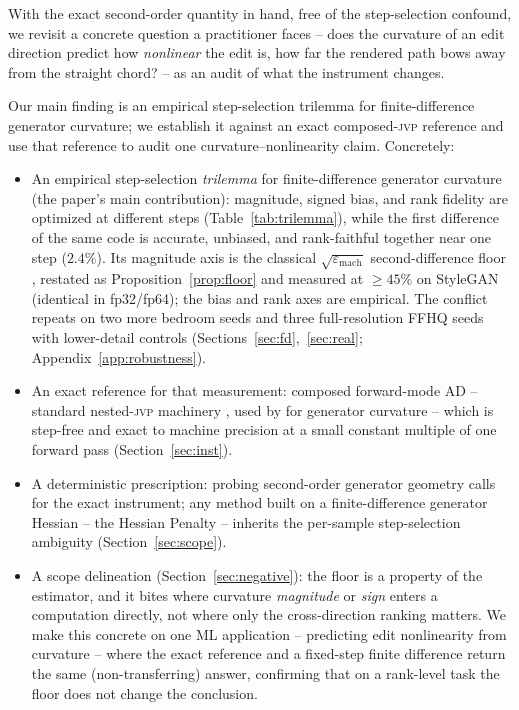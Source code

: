 \documentclass[10pt]{article}
\newcommand{\jvp}{\textsc{jvp}}
\newcommand{\eps}{\varepsilon}
\begin{document}
With the exact second-order quantity in hand, free of the step-selection confound, we
revisit a concrete question a practitioner faces -- does the
curvature of an edit direction predict how \emph{nonlinear} the edit is, how far the
rendered path bows away from the straight chord? -- as an audit of what the instrument
changes.

Our main finding is an empirical step-selection trilemma for finite-difference generator
curvature; we establish it against an exact composed-\jvp{} reference and use that reference
to audit one curvature--nonlinearity claim. Concretely:

\begin{itemize}
\item An empirical step-selection \emph{trilemma} for finite-difference generator curvature
(the paper's main contribution): magnitude, signed bias, and rank fidelity are optimized at
different steps (Table~\ref{tab:trilemma}), while the first difference of the same code is
accurate, unbiased, and rank-faithful together near one step ($2.4\%$). Its magnitude axis is
the classical $\sqrt{\eps_{\mathrm{mach}}}$ second-difference floor \citep{higham2002,press2007},
restated as Proposition~\ref{prop:floor} and measured at $\geq45\%$ on StyleGAN (identical in
fp32/fp64); the bias and rank axes are empirical. The conflict repeats on two more bedroom seeds
and three full-resolution FFHQ seeds with lower-detail controls
(Sections~\ref{sec:fd},~\ref{sec:real}; Appendix~\ref{app:robustness}).
\item An exact reference for that measurement: composed forward-mode AD -- standard
nested-\jvp{} machinery \citep{pearlmutter1994,fike2011,baydin2018,cobb2024}, used by
\citet{lee2023} for generator curvature -- which is step-free and exact to machine precision
at a small constant multiple of one forward pass (Section~\ref{sec:inst}).
\item A deterministic prescription: probing second-order generator geometry calls for the
exact instrument; any method built on a finite-difference generator Hessian -- the Hessian
Penalty \citep{peebles2020} -- inherits the per-sample step-selection ambiguity
(Section~\ref{sec:scope}).
\item A scope delineation (Section~\ref{sec:negative}): the floor is a property of the
estimator, and it bites where curvature \emph{magnitude} or \emph{sign} enters a computation
directly, not where only the cross-direction ranking matters. We make this concrete on one
ML application -- predicting edit nonlinearity from curvature -- where the exact reference and
a fixed-step finite difference return the same (non-transferring) answer, confirming that on a
rank-level task the floor does not change the conclusion.
\end{itemize}
\end{document}
